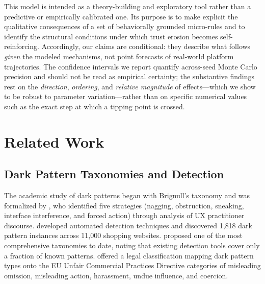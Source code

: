 \documentclass[a4paper,fleqn]{cas-sc}
\begin{document}
This model is intended as a theory-building and exploratory tool rather than a predictive or empirically calibrated one. Its purpose is to make explicit the qualitative consequences of a set of behaviorally grounded micro-rules and to identify the structural conditions under which trust erosion becomes self-reinforcing. Accordingly, our claims are conditional: they describe what follows \emph{given} the modeled mechanisms, not point forecasts of real-world platform trajectories. The confidence intervals we report quantify across-seed Monte Carlo precision and should not be read as empirical certainty; the substantive findings rest on the \emph{direction}, \emph{ordering}, and \emph{relative magnitude} of effects---which we show to be robust to parameter variation---rather than on specific numerical values such as the exact step at which a tipping point is crossed.

\section{Related Work}
\subsection{Dark Pattern Taxonomies and Detection}
The academic study of dark patterns began with Brignull's taxonomy \citep{brignull2010} and was formalized by \citet{gray2018}, who identified five strategies (nagging, obstruction, sneaking, interface interference, and forced action) through analysis of UX practitioner discourse. \citet{mathur2019} developed automated detection techniques and discovered 1{,}818 dark pattern instances across 11{,}000 shopping websites. \citet{li2024} proposed one of the most comprehensive taxonomies to date, noting that existing detection tools cover only a fraction of known patterns. \citet{isola2025} offered a legal classification mapping dark pattern types onto the EU Unfair Commercial Practices Directive categories of misleading omission, misleading action, harassment, undue influence, and coercion.
\end{document}
